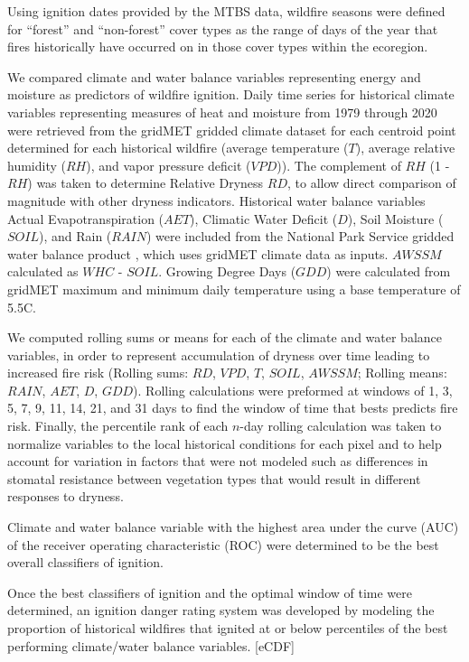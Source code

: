 \documentclass{article}
\begin{document}
Using ignition dates provided by the MTBS data, wildfire seasons were defined for ``forest'' and ``non-forest'' cover types as the range of days of the year that fires historically have occurred on in those cover types within the ecoregion.

We compared climate and water balance variables representing energy and moisture as predictors of wildfire ignition.  Daily time series for historical climate variables representing measures of heat and moisture from 1979 through 2020 were retrieved from the gridMET gridded climate dataset \citep{abatzoglouDevelopmentGriddedSurface2013} for each centroid point determined for each historical wildfire (average temperature ($T$), average relative humidity ($RH$), and vapor pressure deficit ($VPD$)).  The complement of $RH$ (1 - $RH$) was taken to determine Relative Dryness $RD$, to allow direct comparison of magnitude with other dryness indicators. Historical water balance variables Actual Evapotranspiration ($AET$), Climatic Water Deficit ($D$), Soil Moisture ($SOIL$), and Rain ($RAIN$) were included from the National Park Service gridded water balance product \citep{tercekHistoricalChangesPlant2021}, which uses gridMET climate data as inputs.  $AWSSM$ calculated as $WHC$ - $SOIL$.  Growing Degree Days ($GDD$) were calculated from gridMET maximum and minimum daily temperature using a base temperature of 5.5\degree C.

We computed rolling sums or means for each of the climate and water balance variables, in order to represent accumulation of dryness over time leading to increased fire risk (Rolling sums: $RD$, $VPD$, $T$, $SOIL$, $AWSSM$; Rolling means: $RAIN$, $AET$, $D$, $GDD$).  Rolling calculations were preformed at windows of 1, 3, 5, 7, 9, 11, 14, 21, and 31 days to find the window of time that bests predicts fire risk.  Finally, the percentile rank of each $n$-day rolling calculation was taken to normalize variables to the local historical conditions for each pixel and to help account for variation in factors that were not modeled such as differences in stomatal resistance between vegetation types that would result in different responses to dryness.

Climate and water balance variable with the highest area under the curve (AUC) of the receiver operating characteristic (ROC) were determined to be the best overall classifiers of ignition.  

Once the best classifiers of ignition and the optimal window of time were determined, an ignition danger rating system was developed by modeling the proportion of historical wildfires that ignited at or below percentiles of the best performing climate/water balance variables. [eCDF]
\end{document}
